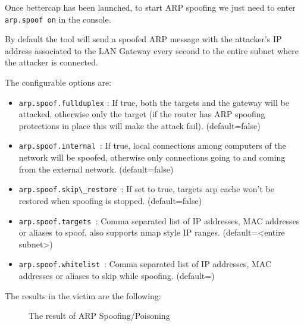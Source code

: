 Once bettercap has been launched, to start ARP spoofing we just need to enter \verb|arp.spoof on| in the console.

By default the tool will send a spoofed ARP message with the attacker's IP address associated to the LAN Gateway every second to the entire subnet where the attacker is connected.

The configurable options are\cite{arp-poof-source-code}:

\begin{itemize}
 \item  \verb|arp.spoof.fullduplex| : If true, both the targets and the gateway will be attacked, otherwise only the target (if the router has ARP spoofing protections in place this will make the attack fail). (default=false)
 \item     \verb|arp.spoof.internal |: If true, local connections among computers of the network will be spoofed, otherwise only connections going to and coming from the external network. (default=false)
 \item \verb|arp.spoof.skip\_restore |: If set to true, targets arp cache won't be restored when spoofing is stopped. (default=false)
 \item      \verb|arp.spoof.targets |: Comma separated list of IP addresses, MAC addresses or aliases to spoof, also supports nmap style IP ranges. (default=<entire subnet>)
 \item    \verb|arp.spoof.whitelist |: Comma separated list of IP addresses, MAC addresses or aliases to skip while spoofing. (default=)
\end{itemize}

The results in the victim are the following:

\begin{figure}[!hb]
\centering
 \vspace{0.5cm}
 \caption{The result of ARP Spoofing/Poisoning}\label{fig: spoof-before-after}
\end{figure}

